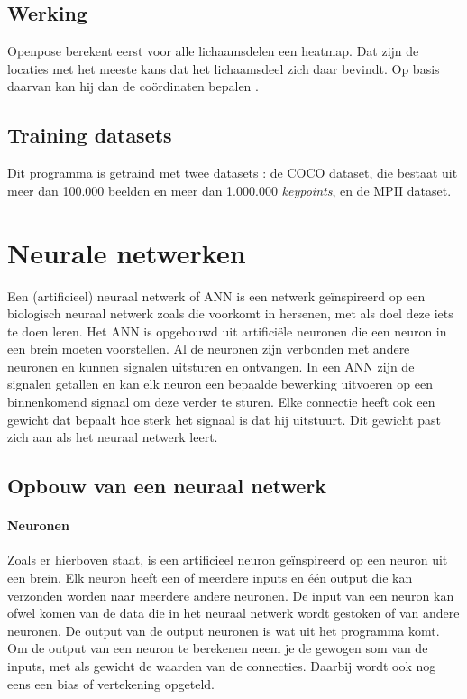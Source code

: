 \documentclass[a4paper,twoside,kulak]{kulakreport}
\begin{document}
\subsection{Werking}
Openpose berekent eerst voor alle lichaamsdelen een heatmap. Dat zijn de locaties met het meeste kans dat het lichaamsdeel zich daar bevindt. Op basis daarvan kan hij dan de coördinaten bepalen \cite{heatmaps}.
\subsection{Training datasets}
Dit programma is getraind met twee datasets \cite{openpose}: de COCO dataset, die bestaat uit meer dan 100.000 beelden en meer dan 1.000.000 \emph{keypoints}, en de MPII dataset.
\section{Neurale netwerken}

Een (artificieel) neuraal netwerk of ANN is een netwerk geïnspireerd op een biologisch neuraal netwerk zoals die voorkomt in hersenen, met als doel deze iets te doen leren. Het ANN is opgebouwd uit artificiële neuronen die een neuron in een brein moeten voorstellen. Al de neuronen zijn verbonden met andere neuronen en kunnen signalen uitsturen en ontvangen. In een ANN zijn de signalen getallen en kan elk neuron een bepaalde bewerking uitvoeren op een binnenkomend signaal om deze verder te sturen. Elke connectie heeft ook een gewicht dat bepaalt hoe sterk het signaal is dat hij uitstuurt. Dit gewicht past zich aan als het neuraal netwerk leert. 

\subsection{Opbouw van een neuraal netwerk}
\paragraph{Neuronen}
Zoals er hierboven staat, is een artificieel neuron geïnspireerd op een neuron uit een brein. Elk neuron heeft een of meerdere inputs en één output die kan verzonden worden naar meerdere andere neuronen. De input van een neuron kan ofwel komen van de data die in het neuraal netwerk wordt gestoken of van andere neuronen. De output van de output neuronen is wat uit het programma komt. Om de output van een neuron te berekenen neem je de gewogen som van de inputs, met als gewicht de waarden van de connecties. Daarbij wordt ook nog eens een bias of vertekening opgeteld.
\end{document}
